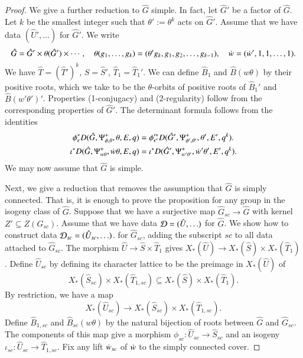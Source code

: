 \begin{proof}
  We give a further reduction to $\hat G$ simple.  In fact, let
  $\hat G'$ be a factor of $\hat G$.  Let $k$ be the smallest integer
  such that $\theta':=\theta^k$ acts on $\hat G'$.  Assume that we
  have data $(\hat U',\ldots)$ for $\hat G'$.  We write
  \[
  \hat G = \hat G' \times \theta(\hat G') \times \cdots,
  \quad
  \theta(g_1,\ldots,g_k) = (\theta' g_k, g_1,g_2,\ldots,g_{k-1}),
  \quad
  \dot w = (\dot w',1,1,\ldots,1).
  \]
  We have $\hat T = (\hat T')^k$, $\hat S = \hat S'$,
  $\hat T_1 = \hat T_1'$.  We can define $\hat B_1$ and
  $\hat B(w\theta)$ by their positive roots, which we take to be the
  $\theta$-orbits of positive roots of $\hat B_1'$ and
  $\hat B( w'\theta')'$.  Properties (1-conjugacy) and (2-regularity)
  follow from the corresponding properties of $\hat G'$.  The
  determinant formula follows from the identities
  \begin{align*}
    \phi^*_\epsilon D(\hat G,\Psi_{\phi,\theta}^+,\theta,E,q) &=
    \phi'^*_{\epsilon'} D(\hat G',\Psi_{\phi',\theta'}^+,\theta',E',q^k).\\
    \iota^* D(\hat G,\Psi_{w\theta}^+,\dot w\theta,E,q) &=
    \iota^* D(\hat G',\Psi_{w'\theta'}^+,\dot w'\theta',E',q^k).
    \end{align*}
    We may now assume that $\hat G$ is simple.

  Next, we give a reduction that removes the assumption that $\hat G$
  is simply connected.  That is, it is enough to prove the proposition for
  any group in the isogeny class of $\hat G$.
  Suppose that we have a surjective map $\hat
  G_{sc}\to \hat G$ with kernel $Z' \subseteq Z(G_{sc})$.  Assume that
  we have data $\mathcal D=(\hat U,\ldots)$ for $\hat G$.  We show how to construct
  data $\mathcal D_{sc}=(\hat U_{sc},\ldots)$. for $\hat G_{sc}$, adding the subscript
  ${sc}$ to all data attached to $\hat G_{sc}$.  The morphism $\hat U
  \to \hat S\times \hat T_1$ gives $X_*(\hat U)\to X_*(\hat S)\times
  X_*(\hat T_1)$.  Define $\hat U_{sc}$ by defining its character
  lattice to be the preimage in $X_*(\hat U)$ of
\[
X_*(\hat S_{sc})\times X_*(\hat T_{1, sc}) 
\subseteq X_*(\hat S)\times X_*(\hat T_1).
\] 
By restriction, we have a map
\[
X_*(\hat U_{sc})\to X_*(\hat S_{sc}) \times X_*(\hat T_{1,sc}).  
\]
Define $\hat B_{1,sc}$ and $\hat B_{sc}(w\theta)$
by the natural bijection of roots between $\hat G$ and $\hat G_{sc}$.
The components of this map give a morphism $\phi_{sc}:\hat U_{sc}\to\hat S_{sc}$
and an isogeny $\iota_{sc}:\hat U_{sc} \to \hat T_{1,sc}$.  Fix any
lift $\dot w_{sc}$ of $\dot w$ to the simply connected cover.


\end{proof}
